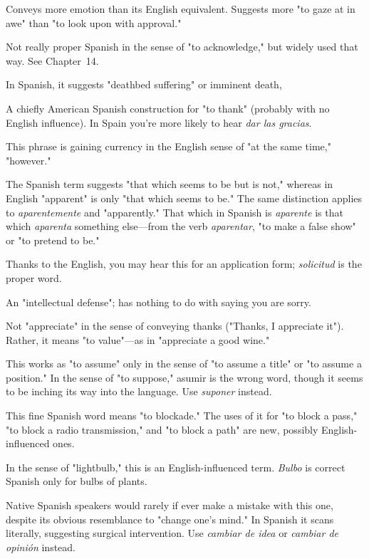  Conveys more emotion than its English equivalent.
Suggests more "to gaze at in awe" than "to look upon with approval."

 Not really proper Spanish in the sense of "to acknowledge," but widely used that way. See Chapter~14.

 In Spanish, it suggests "deathbed suffering" or imminent death,

 A chiefly American Spanish construction for
"to thank" (probably with no English influence). In Spain you're more
likely to hear \emph{dar las gracias}.

 This phrase is gaining currency in the English sense of "at the same time," "however."

 The Spanish term suggests "that which seems
to be but is not," whereas in English "apparent" is only "that which
seems to be." The same distinction applies to \emph{aparentemente} and "apparently." That which in Spanish is \emph{aparente} is that which \emph{aparenta}
something else---from the verb \emph{aparentar}, "to make a false show" or
"to pretend to be."

 Thanks to the English, you may hear this for an
application form; \emph{solicitud} is the proper word.

 An "intellectual defense"; has nothing to do with
saying you are sorry.

 Not "appreciate" in the sense of conveying
thanks ("Thanks, I appreciate it"). Rather, it means "to value"---as
in "appreciate a good wine."

 This works as "to assume" only in the sense of "to
assume a title" or "to assume a position." In the sense of "to suppose,"
asumir is the wrong word, though it seems to be inching its way into
the language. Use \emph{suponer} instead.

 This fine Spanish word means "to blockade."
The uses of it for "to block a pass," "to block a radio transmission,"
and "to block a path" are new, possibly English-influenced ones.

 In the sense of "lightbulb," this is an English-influenced term. \emph{Bulbo} is correct Spanish only for bulbs of plants.

 Native Spanish speakers would rarely if
ever make a mistake with this one, despite its obvious resemblance to
"change one's mind." In Spanish it scans literally, suggesting surgical
intervention. Use \emph{cambiar de idea} or \emph{cambiar de opinión} instead.

